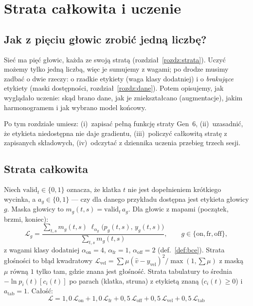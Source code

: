 \chapter{Strata całkowita i uczenie}\label{rozdz:uczenie}

\section{Jak z pięciu głowic zrobić jedną liczbę?}

Sieć ma pięć głowic, każda ze swoją stratą (rozdział~\ref{rozdz:strata}). Uczyć możemy tylko jedną liczbą, więc je sumujemy z wagami; po drodze musimy zadbać o dwie rzeczy: o rzadkie etykiety (waga klasy dodatniej) i o \emph{brakujące} etykiety (maski dostępności, rozdział~\ref{rozdz:dane}).
Potem opisujemy, jak wyglądało uczenie: skąd brano dane, jak je zniekształcano (augmentacje), jakim harmonogramem i jak wybrano model końcowy.

Po tym rozdziale umiesz: (i)~zapisać pełną funkcję straty Gen~6, (ii)~uzasadnić, że etykieta niedostępna nie daje gradientu, (iii)~policzyć całkowitą stratę z zapisanych składowych, (iv)~odczytać z dziennika uczenia przebieg trzech sesji.

\section{Strata całkowita}

Niech $\mathrm{valid}_t\in\{0,1\}$ oznacza, że klatka $t$ nie jest dopełnieniem krótkiego wycinka, a $a_g\in\{0,1\}$ --- czy dla danego przykładu dostępna jest etykieta głowicy $g$. Maska głowicy to $m_g(t,s)=\mathrm{valid}_t\,a_g$. Dla głowic z mapami (początek, brzmi, koniec):
\begin{equation}
  \mathcal L_g=\frac{\sum_{t,s}m_g(t,s)\;\ell_{\alpha_g}\big(p_g(t,s),\,y_g(t,s)\big)}{\sum_{t,s}m_g(t,s)},\qquad g\in\{\mathrm{on},\mathrm{fr},\mathrm{off}\},
\end{equation}
z wagami klasy dodatniej $\alpha_\mathrm{on}=4$, $\alpha_\mathrm{fr}=1$, $\alpha_\mathrm{off}=2$ (def.~\ref{def:bce}). Strata głośności to błąd kwadratowy $\mathcal L_\mathrm{vel}=\sum\mu(\hat v-y_\mathrm{vel})^2\big/\max(1,\sum\mu)$ z maską $\mu$ równą $1$ tylko tam, gdzie znana jest głośność.
Strata tabulatury to średnia $-\ln p_i(t)[c_i(t)]$ po parach (klatka, struna) z etykietą znaną ($c_i(t)\ge0$) i $a_\mathrm{tab}=1$. Całość:
\begin{equation}
  \boxed{\ \mathcal L=1{,}0\,\mathcal L_\mathrm{on}+1{,}0\,\mathcal L_\mathrm{fr}+0{,}5\,\mathcal L_\mathrm{off}+0{,}5\,\mathcal L_\mathrm{vel}+0{,}5\,\mathcal L_\mathrm{tab}\ }
  \label{eq:strata}
\end{equation}

